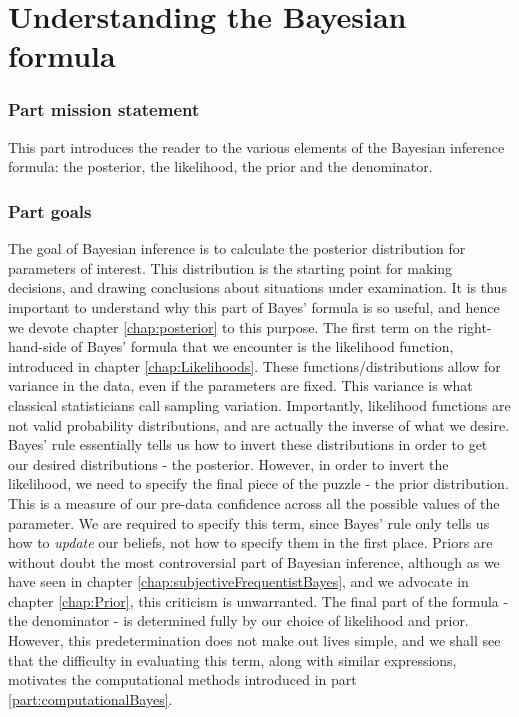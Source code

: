 \documentclass[11pt,fullpage]{book}
\begin{document}
\part{Understanding the Bayesian formula}\label{part:bayesianFormula}
\section{Part mission statement}
This part introduces the reader to the various elements of the Bayesian inference formula: the posterior, the likelihood, the prior and the denominator.

\section{Part goals}
The goal of Bayesian inference is to calculate the posterior distribution for parameters of interest. This distribution is the starting point for making decisions, and drawing conclusions about situations under examination. It is thus important to understand why this part of Bayes' formula is so useful, and hence we devote chapter \ref{chap:posterior} to this purpose. The first term on the right-hand-side of Bayes' formula that we encounter is the likelihood function, introduced in chapter \ref{chap:Likelihoods}. These functions/distributions allow for variance in the data, even if the parameters are fixed. This variance is what classical statisticians call sampling variation. Importantly, likelihood functions are not valid probability distributions, and are actually the inverse of what we desire. Bayes' rule essentially tells us how to invert these distributions in order to get our desired distributions - the posterior. However, in order to invert the likelihood, we need to specify the final piece of the puzzle - the prior distribution. This is a measure of our pre-data confidence across all the possible values of the parameter. We are required to specify this term, since Bayes' rule only tells us how to \textit{update} our beliefs, not how to specify them in the first place. Priors are without doubt the most controversial part of Bayesian inference, although as we have seen in chapter \ref{chap:subjectiveFrequentistBayes}, and we advocate in chapter \ref{chap:Prior}, this criticism is unwarranted. The final part of the formula - the denominator - is determined fully by our choice of likelihood and prior. However, this predetermination does not make out lives simple, and we shall see that the difficulty in evaluating this term, along with similar expressions, motivates the computational methods introduced in part \ref{part:computationalBayes}.
\end{document}
